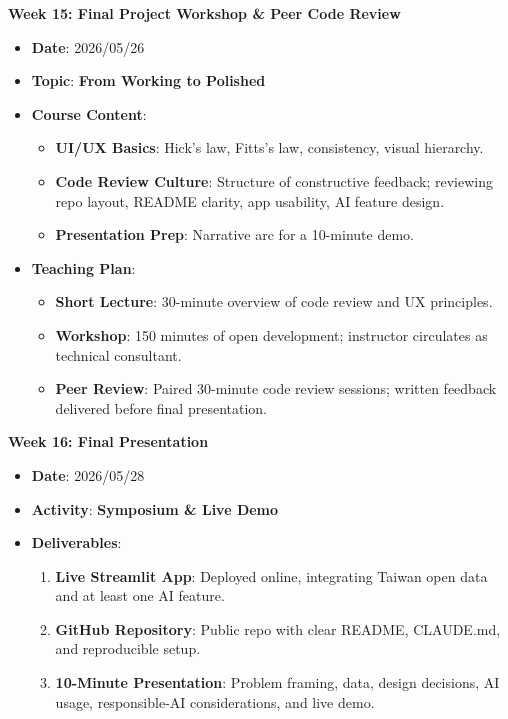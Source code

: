 \noindent\textbf{Week 15: Final Project Workshop \& Peer Code Review}
\begin{itemize}
    \item \textbf{Date}: 2026/05/26
    \item \textbf{Topic}: \textbf{From Working to Polished}
    \item \textbf{Course Content}:
    \begin{itemize}
        \item \textbf{UI/UX Basics}: Hick's law, Fitts's law, consistency, visual hierarchy.
        \item \textbf{Code Review Culture}: Structure of constructive feedback; reviewing repo layout, README clarity, app usability, AI feature design.
        \item \textbf{Presentation Prep}: Narrative arc for a 10-minute demo.
    \end{itemize}
    \item \textbf{Teaching Plan}:
    \begin{itemize}
        \item \textbf{Short Lecture}: 30-minute overview of code review and UX principles.
        \item \textbf{Workshop}: 150 minutes of open development; instructor circulates as technical consultant.
        \item \textbf{Peer Review}: Paired 30-minute code review sessions; written feedback delivered before final presentation.
    \end{itemize}
\end{itemize}

\noindent\textbf{Week 16: Final Presentation}
\begin{itemize}
    \item \textbf{Date}: 2026/05/28
    \item \textbf{Activity}: \textbf{Symposium \& Live Demo}
    \item \textbf{Deliverables}:
    \begin{enumerate}
        \item \textbf{Live Streamlit App}: Deployed online, integrating Taiwan open data and at least one AI feature.
        \item \textbf{GitHub Repository}: Public repo with clear README, CLAUDE.md, and reproducible setup.
        \item \textbf{10-Minute Presentation}: Problem framing, data, design decisions, AI usage, responsible-AI considerations, and live demo.
    \end{enumerate}
\end{itemize}


